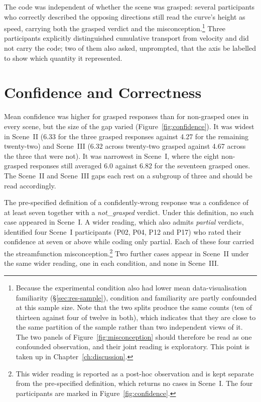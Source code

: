 The code was independent of whether the scene was grasped: several participants who correctly described the opposing directions still read the curve's height as speed, carrying both the grasped verdict and the misconception.\footnote{Because the experimental condition also had lower mean data-visualisation familiarity (\S\ref{sec:res-sample}), condition and familiarity are partly confounded at this sample size. Note that the two splits produce the same counts (ten of thirteen against four of twelve in both), which indicates that they are close to the same partition of the sample rather than two independent views of it. The two panels of Figure~\ref{fig:misconception} should therefore be read as one confounded observation, and their joint reading is exploratory. This point is taken up in Chapter~\ref{ch:discussion}.} Three participants explicitly distinguished cumulative transport from velocity and did not carry the code; two of them also asked, unprompted, that the axis be labelled to show which quantity it represented.

\section{Confidence and Correctness}
\label{sec:res-confidence}

Mean confidence was higher for grasped responses than for non-grasped ones in every scene, but the size of the gap varied (Figure~\ref{fig:confidence}). It was widest in Scene~II (6.33 for the three grasped responses against 4.27 for the remaining twenty-two) and Scene~III (6.32 across twenty-two grasped against 4.67 across the three that were not). It was narrowest in Scene~I, where the eight non-grasped responses still averaged 6.0 against 6.82 for the seventeen grasped ones. The Scene~II and Scene~III gaps each rest on a subgroup of three and should be read accordingly.

The pre-specified definition of a confidently-wrong response was a confidence of at least seven together with a \emph{not\_grasped} verdict. Under this definition, no such case appeared in Scene~I. A wider reading, which also admits \emph{partial} verdicts, identified four Scene~I participants (P02, P04, P12 and P17) who rated their confidence at seven or above while coding only partial. Each of these four carried the streamfunction misconception.\footnote{This wider reading is reported as a post-hoc observation and is kept separate from the pre-specified definition, which returns no cases in Scene~I. The four participants are marked in Figure~\ref{fig:confidence}.} Two further cases appear in Scene~II under the same wider reading, one in each condition, and none in Scene~III.


